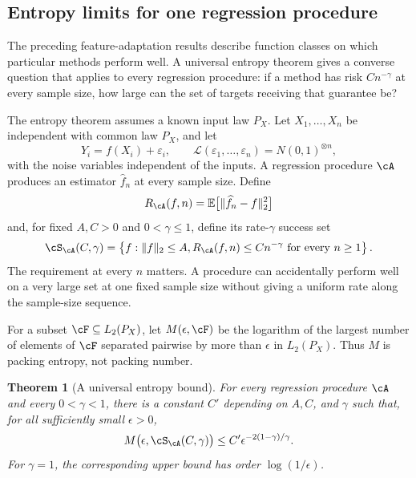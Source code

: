 \documentclass[11pt,twoside]{article}
\newcommand{\E}{\mathbb E}
\newcommand{\Law}{\mathcal L}
\newtheorem{theorem}{Theorem}[section]
\theoremstyle{definition}
\theoremstyle{remark}
\begin{document}
\subsection{Entropy limits for one regression procedure}
\label{sec:yang}

The preceding feature-adaptation results describe function classes on which
particular methods perform well. A universal entropy theorem gives a converse question that
applies to every regression procedure: if a method has risk $Cn^{-\gamma}$
at every sample size, how large can the set of targets receiving that
guarantee be?

The entropy theorem assumes a known input law $P_X$. Let
$X_1,\ldots,X_n$ be independent with common law $P_X$, and let
\begin{equation}
 Y_i=f(X_i)+\varepsilon_i,
 \qquad
 \Law(\varepsilon_1,\ldots,\varepsilon_n)
 =N(0,1)^{\otimes n},
 \label{eq:yang-model}
\end{equation}
with the noise variables independent of the inputs. A regression procedure
$\cA$ produces an estimator $\widehat f_n$ at every sample size. Define
\begin{equation}
 R_{\cA}(f,n)=\E\bigl[\|\widehat f_n-f\|_2^2\bigr]
 \label{eq:yang-risk}
\end{equation}
and, for fixed $A,C>0$ and $0<\gamma\leq1$, define its rate-$\gamma$
success set
\begin{equation}
 \cS_{\cA}(C,\gamma)
 =\left\{f:\|f\|_2\leq A,\quad
 R_{\cA}(f,n)\leq Cn^{-\gamma}
 \text{ for every }n\geq1\right\}.
 \label{eq:success-set}
\end{equation}
The requirement at every $n$ matters. A procedure can accidentally perform
well on a very large set at one fixed sample size without giving a uniform
rate along the sample-size sequence.

For a subset $\cF\subseteq L_2(P_X)$, let $M(\epsilon,\cF)$ be the logarithm
of the largest number of elements of $\cF$ separated pairwise by more than
$\epsilon$ in $L_2(P_X)$. Thus $M$ is packing entropy, not packing number.

\begin{theorem}[A universal entropy bound]
\label{thm:yang}
For every regression procedure $\cA$ and every $0<\gamma<1$, there is a
constant $C'$ depending on $A,C$, and $\gamma$ such that, for all sufficiently
small $\epsilon>0$,
\begin{equation}
 M\bigl(\epsilon,\cS_{\cA}(C,\gamma)\bigr)
 \leq C'\epsilon^{-2(1-\gamma)/\gamma}.
 \label{eq:yang-entropy}
\end{equation}
For $\gamma=1$, the corresponding upper bound has order
$\log(1/\epsilon)$.
\end{theorem}
\end{document}
